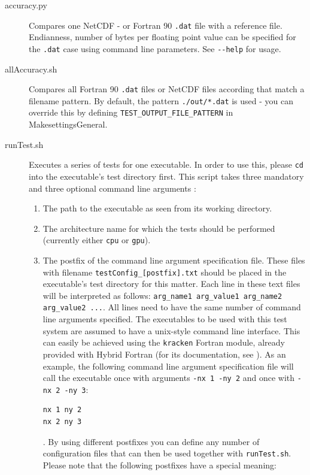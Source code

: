 {\begin{description}
 \item [accuracy.py] Compares one NetCDF - or Fortran 90 \verb|.dat| file with a reference file. Endianness, number of bytes per floating point value can be specified for the \verb|.dat| case using command line parameters. See \verb|--help| for usage.
 \item [allAccuracy.sh] Compares all Fortran 90 \verb|.dat| files or NetCDF files according that match a filename pattern. By default, the pattern \verb|./out/*.dat| is used - you can override this by defining \verb|TEST_OUTPUT_FILE_PATTERN| in MakesettingsGeneral.
 \item [runTest.sh] Executes a series of tests for one executable. In order to use this, please \verb|cd| into the executable's test directory first. This script takes three mandatory and three optional command line arguments :
  \begin{enumerate}
   \item The path to the executable as seen from its working directory.
   \item The architecture name for which the tests should be performed (currently either \verb|cpu| or \verb|gpu|).
   \item The postfix of the command line argument specification file. These files with filename \verb|testConfig_[postfix].txt| should be placed in the executable's test directory for this matter. Each line in these text files will be interpreted as follows: \linebreak
   \verb|arg_name1 arg_value1 arg_name2 arg_value2 ...|. All lines need to have the same number of command line arguments specified. The executables to be used with this test system are assumed to have a unix-style command line interface. This can easily be achieved using the \verb|kracken| Fortran module, already provided with Hybrid Fortran (for its documentation, see \cite{Kracken}). As an example, the following command line argument specification file will call the executable once with arguments \verb|-nx 1 -ny 2| and once with \verb|-nx 2 -ny 3|:
\begin{lstlisting}[name=commandLineSpecification, label=listing:commandLineSpecification, caption={A sample command line argument specification file}]
nx 1 ny 2
nx 2 ny 3
\end{lstlisting}. By using different postfixes you can define any number of configuration files that can then be used together with \verb|runTest.sh|. Please note that the following postfixes have a special meaning:

\end{enumerate}
\end{description}}
